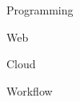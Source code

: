 

\cventrytech
    {Programming}
    {
        \diPythonPlainWordmark
        \diJavascriptPlain
        \diCplusplusPlainWordmark
        \diJavaPlainWordmark
        \diGoPlain
        \diRubyPlainWordmark
        \disHaskell
        \disClojurePlain
        \disScala
        \diSwiftPlainWordmark
    }

\cventrytech
    {Web}
    {
        \diPhpPlain
        \diBootstrapPlainWordmark
        \diJqueryPlainWordmark
        \diApachePlainWordmark
        \diMysqlPlainWordmark
        \diWordpressPlainWordmark
        \diVuejsPlainWordmark
        \diReactPlainWordmark
    }

\cventrytech
    {Cloud}
    {
        \diDockerPlainWordmark
        \disGCP
        \diAmazonwebservicesPlain
    }

\cventrytech
    {Workflow}
    {
        \diTravisPlainWordmark
        \diAtomPlainWordmark
        \diVimPlain
        \diGitPlainWordmark
        \diConfluencePlainWordmark
        \diSlackPlainWordmark
        \diTrelloPlainWordmark
    }
